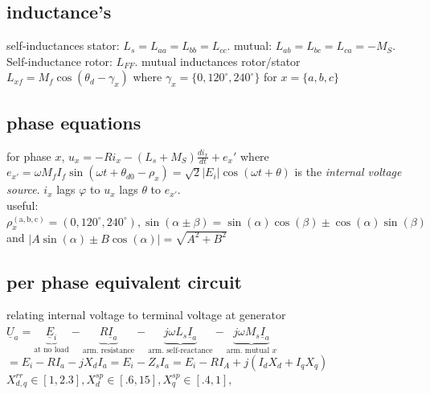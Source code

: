 \documentclass[a4paper,10pt,landscape]{scrartcl}
\begin{document}
\begin{multicols*}{3}
\subsection{inductance's}
self-inductances stator: $L_s=L_{aa}=L_{bb}=L_{cc}$. mutual: $L_{ab}=L_{bc}=L_{ca}=-M_S$. Self-inductance rotor: $L_{FF}$. mutual inductances rotor/stator $L_{xf}=M_f\cos(\theta_d-\gamma_x)$ where $\gamma_x=\{0,120^\circ,240^\circ\}$ for $x=\{a,b,c\}$

\subsection{phase equations}
for phase $x$, $u_x=-R i_x - (L_s+M_S)\frac{di_x}{dt}+e_x'$ where $e_{x'}=\omega M_fI_f\sin(\omega t+\theta_{d0}-\rho_x)=\sqrt{2}|E_i|\cos (\omega t+\theta)$ is the \textit{internal voltage source}. $i_x$ lags $\varphi$ to $u_x$ lags $\theta$ to $e_{x'}$. \\
useful: $\rho_x^{\mathrm{(a,b,c)}}=(0,120^\circ,240^\circ),\sin(\alpha\pm\beta)=\sin(\alpha)\cos(\beta)\pm\cos(\alpha)\sin(\beta)$ and $|A\sin(\alpha)\pm B\cos(\alpha)|=\sqrt{A^2+B^2}$

\subsection{per phase equivalent circuit}
relating internal voltage to terminal voltage at generator \\
$\underline{U}_a = \underbrace{\underline{E}_i}_\text{at no load} - \underbrace{R\underline{I}_a}_\text{arm. resistance} - \underbrace{j\omega L_s \underline{I}_a}_\text{arm. self-reactance} - \underbrace{j\omega M_s\underline{I}_a}_\text{arm. mutual $x$}$ \\
$=E_i-RI_a-jX_dI_a=E_i - Z_sI_a=E_i-RI_A+j(I_dX_d+I_qX_q)$
$X_{d,q}^{rr}\in[1,2.3], X_d^{sp}\in[.6,15], X_q^{sp}\in[.4,1],$

\vfill\null
\columnbreak


\end{multicols*}
\end{document}
